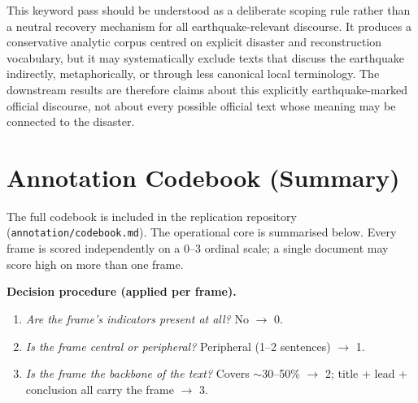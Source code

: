 This keyword pass should be understood as a deliberate scoping rule rather than a
neutral recovery mechanism for all earthquake-relevant discourse. It produces a
conservative analytic corpus centred on explicit disaster and reconstruction
vocabulary, but it may systematically exclude texts that discuss the earthquake
indirectly, metaphorically, or through less canonical local terminology. The
downstream results are therefore claims about this explicitly earthquake-marked
official discourse, not about every possible official text whose meaning may be
connected to the disaster.

\section{Annotation Codebook (Summary)}
\label{app:codebook}
The full codebook is included in the replication repository
(\texttt{annotation/codebook.md}). The operational core is summarised below.
Every frame is scored independently on a 0--3 ordinal scale; a single document may
score high on more than one frame.

\noindent\textbf{Decision procedure (applied per frame).}
\begin{enumerate}
\item \emph{Are the frame's indicators present at all?} No $\rightarrow$ 0.
\item \emph{Is the frame central or peripheral?} Peripheral (1--2 sentences)
      $\rightarrow$ 1.
\item \emph{Is the frame the backbone of the text?} Covers $\sim$30--50\%
      $\rightarrow$ 2; title + lead + conclusion all carry the frame $\rightarrow$ 3.
\end{enumerate}

